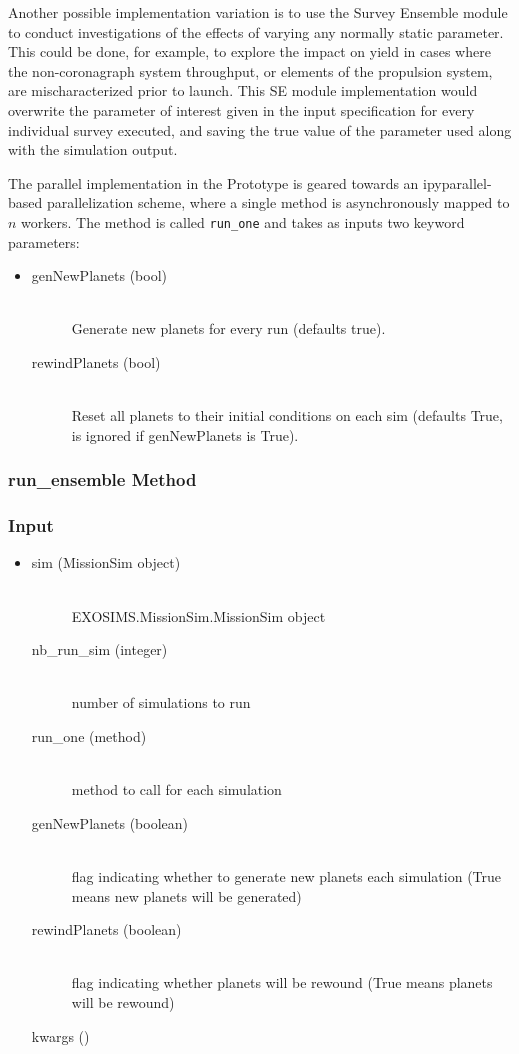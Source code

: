 \documentclass[cleanfoot]{asme2ej}
\begin{document}
Another possible implementation variation is to use the Survey Ensemble module to conduct investigations of the effects of varying any normally static parameter.  This could be done, for example, to explore the impact on yield in cases where the non-coronagraph system throughput, or elements of the propulsion system, are mischaracterized prior to launch.  This SE module implementation would overwrite the parameter of interest given in the input specification for every individual survey executed, and saving the true value of the parameter used along with the simulation output.

The parallel implementation in the Prototype is geared towards an ipyparallel-based parallelization scheme, where a single method is asynchronously mapped to $n$ workers.  The method is called \verb+run_one+ and takes as inputs two keyword parameters:

\begin{itemize}
\item 
\begin{description}
    \item[genNewPlanets (bool)] \hfill \\ Generate new planets for every run (defaults true).
    \item[rewindPlanets (bool)] \hfill \\ Reset all planets to their initial conditions on each sim (defaults True, is ignored if genNewPlanets is True).
\end{description}
\end{itemize}

\subsubsection{run\_ensemble Method} 
\subsubsection*{Input}
\begin{itemize}
\item
\begin{description}
    \item[sim (MissionSim object)] \hfill \\ EXOSIMS.MissionSim.MissionSim object
    \item[nb\_run\_sim (integer)] \hfill \\ number of simulations to run
    \item[run\_one (method)] \hfill \\ method to call for each simulation
    \item[genNewPlanets (boolean)] \hfill \\ flag indicating whether to generate new planets each simulation (True means new planets will be generated)
    \item[rewindPlanets (boolean)] \hfill \\ flag indicating whether planets will be rewound (True means planets will be rewound)
    \item[kwargs ()] \hfill \\
\end{description}
\end{itemize}
\end{document}

